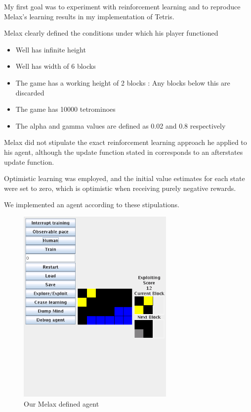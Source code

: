 \documentclass{rucsthesis}
\begin{document}
My first goal was to experiment with reinforcement learning and to reproduce Melax's learning results in my implementation of Tetris.  

Melax clearly defined the conditions under which his player functioned

\begin{itemize}
\item{Well has infinite height}
\item{Well has width of 6 blocks}
\item{The game has a working height of 2 blocks : Any blocks below this are discarded}
\item{The game has 10000 tetrominoes}
\item{The alpha and gamma values are defined as 0.02 and 0.8 respectively}
\end{itemize}

Melax did not stipulate the exact reinforcement learning approach he applied to his agent, although the update function stated in \cite{melaxtetris} corresponds to an afterstates update function.

Optimistic learning was employed, and the initial value estimates for each state were set to zero, which is optimistic when receiving purely negative rewards.

We implemented an agent according to these stipulations.

\begin{figure}[h]
\centering
\includegraphics[width=3in]{mymelax.png}
\caption{Our Melax defined agent}
\label{fig:mymelax}
\end{figure}
\end{document}
